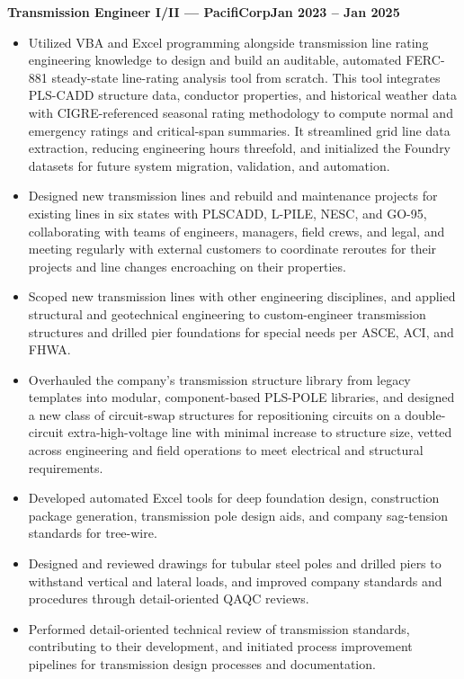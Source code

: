 \documentclass[10pt, letterpaper]{article}
\newcommand{\jobline}[2]{%
  \vspace{5pt}%
  \noindent\textbf{#1}\hfill\textbf{#2}\par%
  \vspace{1pt}%
}
\newenvironment{rlist}{%
  \begin{itemize}[leftmargin=1.4em, itemsep=1pt, topsep=2pt, parsep=0pt]%
}{%
  \end{itemize}%
}
\begin{document}
\jobline{Transmission Engineer I/II --- PacifiCorp}{Jan 2023 -- Jan 2025}
\begin{rlist}
  \item Utilized VBA and Excel programming alongside transmission line rating engineering knowledge to design and build an auditable, automated FERC-881 steady-state line-rating analysis tool from scratch. This tool integrates PLS-CADD structure data, conductor properties, and historical weather data with CIGRE-referenced seasonal rating methodology to compute normal and emergency ratings and critical-span summaries. It streamlined grid line data extraction, reducing engineering hours threefold, and initialized the Foundry datasets for future system migration, validation, and automation.
  \item Designed new transmission lines and rebuild and maintenance projects for existing lines in six states with PLSCADD, L-PILE, NESC, and GO-95, collaborating with teams of engineers, managers, field crews, and legal, and meeting regularly with external customers to coordinate reroutes for their projects and line changes encroaching on their properties.
  \item Scoped new transmission lines with other engineering disciplines, and applied structural and geotechnical engineering to custom-engineer transmission structures and drilled pier foundations for special needs per ASCE, ACI, and FHWA.
  \item Overhauled the company's transmission structure library from legacy templates into modular, component-based PLS-POLE libraries, and designed a new class of circuit-swap structures for repositioning circuits on a double-circuit extra-high-voltage line with minimal increase to structure size, vetted across engineering and field operations to meet electrical and structural requirements.
  \item Developed automated Excel tools for deep foundation design, construction package generation, transmission pole design aids, and company sag-tension standards for tree-wire.
  \item Designed and reviewed drawings for tubular steel poles and drilled piers to withstand vertical and lateral loads, and improved company standards and procedures through detail-oriented QAQC reviews.
  \item Performed detail-oriented technical review of transmission standards, contributing to their development, and initiated process improvement pipelines for transmission design processes and documentation.
\end{rlist}
\end{document}
